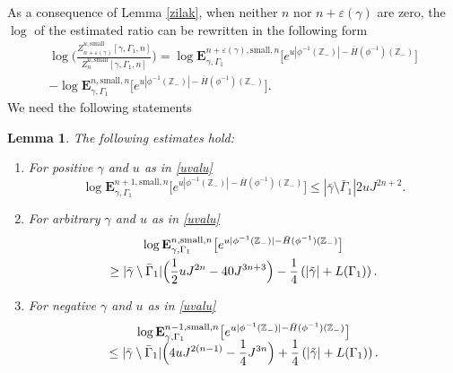 \documentclass[10pt]{amsart}
\newenvironment{enumeratei}
{\bgroup\def\theenumi{\roman{enumi}}\def\theenumii{\Alph{enumii}}\begin{enumerate}}
{\end{enumerate}\egroup}
\numberwithin{equation}{section}
\theoremstyle{plain}
\newtheorem{lemma}[theorem]{Lemma}
\theoremstyle{definition}
\newcommand{\sm}{\mathrm{small}}
\newcommand{\bE}{{\ensuremath{\mathbf E}} }
\newcommand{\bbZ}{{\ensuremath{\mathbb Z}} }
\newcommand{\gep}{\varepsilon}
\newcommand{\gG}{\Gamma}
\begin{document}
As a consequence of Lemma \ref{zilak},
when neither $n$ nor $n+\gep(\gamma)$ are zero, the $\log$ of the estimated ratio can be rewritten in the following form
\begin{multline}\label{crounch}
\log \biggl(\frac{ Z^{u,\sm}_{n+\gep(\gamma)}[\gamma,\Gamma_1,n]}{ Z^{u,\sm}_{n}[\gamma,\Gamma_1,n]}\biggr)=
\log \bE^{n+\gep(\gamma),\sm,n}_{\gamma,\gG_1}\bigl[ e^{u |\phi^{-1}(\bbZ_-)|- \bar H(\phi^{-1})(\bbZ_-)} \bigr] \\[-3pt]
- \log
\bE^{n,\sm,n}_{\gamma,\gG_1}\bigl[ e^{u |\phi^{-1}(\bbZ_-)|- \bar H(\phi^{-1})(\bbZ_-)} \bigr].
\end{multline}
We need the following statements
\begin{lemma}\label{dalo}
The following estimates hold:
\begin{enumeratei}
\item\label{dalo1}
For positive $\gamma$ and $u$ as in \eqref{uvalu}
\begin{equation*}
\log \bE^{n+1,\sm,n}_{\gamma,\gG_1}\bigl[ e^{u |\phi^{-1}(\bbZ_-)|- \bar H(\phi^{-1})(\bbZ_-)} \bigr]\le |\bar \gamma \setminus \bar \Gamma_1| 2u J^{2n+2}.
\end{equation*}
\item\label{dalo2}
For arbitrary $\gamma$ and $u$ as in \eqref{uvalu}
\begin{multline}\label{ckonveu}
\log \bE^{n,\sm, n}_{\gamma,\gG_1}\bigl[ e^{u |\phi^{-1}(\bbZ_-)|- \bar H(\phi^{-1})(\bbZ_-)} \bigr]\\
\ge |\bar \gamma \setminus \bar \Gamma_1|
\Bigl(\frac{1}{2}u J^{2n}- 40 J^{3n+3}\Bigr)-\frac{1}{4}\left(|\tilde \gamma|+L(\gG_1) \right).
\end{multline}
\item\label{dalo3}
For negative $\gamma$ and $u$ as in \eqref{uvalu}
\begin{multline*}%
\log \bE^{n-1,\sm, n}_{\gamma,\gG_1}\bigl[ e^{u |\phi^{-1}(\bbZ_-)|- \bar H(\phi^{-1})(\bbZ_-)} \bigr]\\[-5pt]
\le |\bar \gamma \setminus \bar \Gamma_1|
\Bigl(4u J^{2(n-1)}-\frac{1}{4}J^{3n}\Bigr)+\frac{1}{4}\left(|\tilde \gamma|+L(\gG_1) \right).
\end{multline*}
\end{enumeratei}
\end{lemma}
\end{document}
